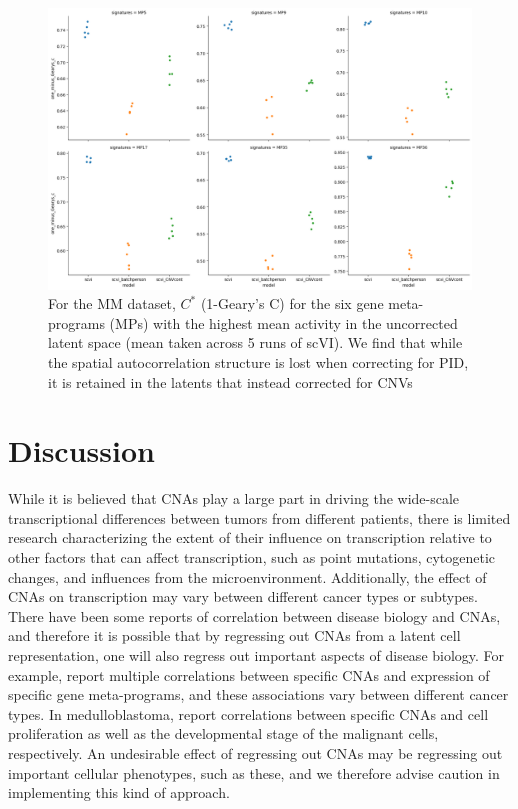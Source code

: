 \documentclass{article}
\begin{document}
\begin{figure}
    \centering
    \includegraphics[width=\textwidth]{figures/gearys_c_mm_top6.png}
    \caption{For the MM dataset, $C^*$ (1-Geary's C) for the six gene meta-programs (MPs) with the highest mean activity in the uncorrected latent space (mean taken across 5 runs of scVI). We find that while the spatial autocorrelation structure is lost when correcting for PID, it is retained in the latents that instead corrected for CNVs}
    \label{fig:gearys_mm_results}
\end{figure}

\section{Discussion}
While it is believed that CNAs play a large part in driving the wide-scale transcriptional differences between tumors from different patients, there is limited research characterizing the extent of their influence on transcription relative to other factors that can affect transcription, such as point mutations, cytogenetic changes, and influences from the microenvironment. Additionally, the effect of CNAs on transcription may vary between different cancer types or subtypes. There have been some reports of correlation between disease biology and CNAs, and therefore it is possible that by regressing out CNAs from a latent cell representation, one will also regress out important aspects of disease biology. For example, \cite{gavish2023hallmarks} report multiple correlations between specific CNAs and expression of specific gene meta-programs, and these associations vary between different cancer types. In medulloblastoma, \cite{gold2022developmental} report correlations between specific CNAs and cell proliferation as well as the developmental stage of the malignant cells, respectively. An undesirable effect of regressing out CNAs may be regressing out important cellular phenotypes, such as these, and we therefore advise caution in implementing this kind of approach.
\end{document}

